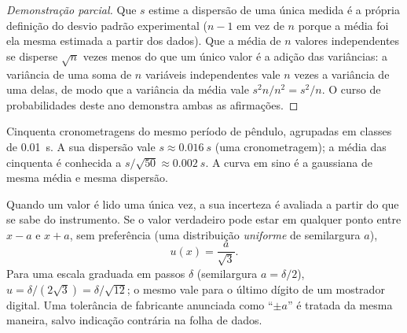\begin{proof}[Demonstração parcial]
Que $s$ estime a dispersão de uma única medida é a própria definição do
desvio padrão experimental ($n - 1$ em vez de $n$ porque a média foi ela
mesma estimada a partir dos dados). Que a média de $n$ valores
independentes se disperse $\sqrt n$ vezes menos do que um único valor é a
adição das variâncias: a variância de uma soma de $n$ variáveis
independentes vale $n$ vezes a variância de uma delas, de modo que a
variância da média vale $s^2 n / n^2 = s^2/n$. O curso de probabilidades
deste ano demonstra ambas as afirmações.
\end{proof}

\begin{omfigure}

{\small Cinquenta cronometragens do mesmo período de pêndulo, agrupadas em
classes de \qty{0.01}{s}. A sua dispersão vale $s \approx \qty{0.016}{s}$
(uma cronometragem); a média das cinquenta é conhecida a
$s/\sqrt{50} \approx \qty{0.002}{s}$. A curva em sino é a gaussiana de
mesma média e mesma dispersão.}
\end{omfigure}

\begin{proposition}\label{prop:b1:units-dimensions:typeB}
Quando um valor é lido uma única vez, a sua incerteza é avaliada a partir
do que se sabe do instrumento. Se o valor verdadeiro pode estar em
qualquer ponto entre $x - a$ e $x + a$, sem preferência (uma distribuição
\emph{uniforme} de semilargura $a$),
\[
u(x) = \frac{a}{\sqrt 3} .
\]
Para uma escala graduada em passos $\delta$ (semilargura $a = \delta/2$),
$u = \delta/(2\sqrt3) = \delta/\sqrt{12}$; o mesmo vale para o último
dígito de um mostrador digital. Uma tolerância de fabricante anunciada
como ``$\pm a$'' é tratada da mesma maneira, salvo indicação contrária na
folha de dados.
\end{proposition}

